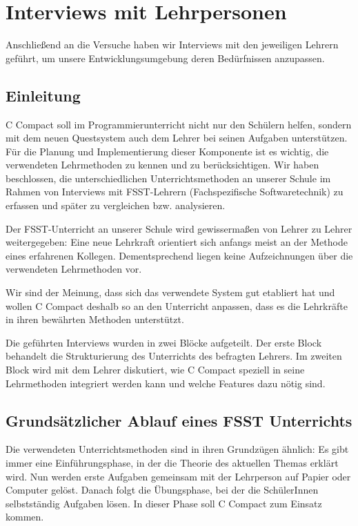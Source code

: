 \section{Interviews mit Lehrpersonen}
Anschließend an die Versuche haben wir Interviews mit den jeweiligen Lehrern geführt, um unsere Entwicklungsumgebung deren Bedürfnissen anzupassen. 

\subsection{Einleitung}
C Compact soll im Programmierunterricht nicht nur den Schülern helfen, sondern mit dem neuen Questsystem auch dem Lehrer bei seinen Aufgaben unterstützen. Für die Planung und Implementierung dieser Komponente ist es wichtig, die verwendeten Lehrmethoden zu kennen und zu berücksichtigen. Wir haben beschlossen, die unterschiedlichen Unterrichtsmethoden an unserer Schule im Rahmen von Interviews mit FSST-Lehrern (Fachspezifische Softwaretechnik) zu erfassen und später zu vergleichen bzw. analysieren. 

Der FSST-Unterricht an unserer Schule wird gewissermaßen von Lehrer zu Lehrer weitergegeben:
Eine neue Lehrkraft orientiert sich anfangs meist an der Methode eines erfahrenen Kollegen. Dementsprechend liegen keine Aufzeichnungen über die verwendeten Lehrmethoden vor. 

Wir sind der Meinung, dass sich das verwendete System gut etabliert hat und wollen C Compact deshalb so an den Unterricht anpassen, dass es die Lehrkräfte in ihren bewährten Methoden unterstützt.

Die geführten Interviews wurden in zwei Blöcke aufgeteilt. Der erste Block behandelt die Strukturierung des Unterrichts des befragten Lehrers. Im zweiten Block wird mit dem Lehrer diskutiert, wie C Compact speziell in seine Lehrmethoden integriert werden kann und welche Features dazu nötig sind.

\subsection{Grundsätzlicher Ablauf eines FSST Unterrichts}
Die verwendeten Unterrichtsmethoden sind in ihren Grundzügen ähnlich: Es gibt immer eine Einführungsphase, in der die Theorie des aktuellen Themas erklärt wird. Nun werden erste Aufgaben gemeinsam mit der Lehrperson auf Papier oder Computer gelöst. Danach folgt die Übungsphase, bei der die SchülerInnen selbstständig Aufgaben lösen. In dieser Phase soll C Compact zum Einsatz kommen.

